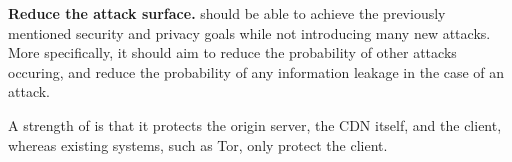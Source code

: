 {\bf Reduce the attack surface.} \system{} should be able to achieve the previously mentioned security 
and privacy goals while not introducing many new attacks.  More specifically, it should aim to reduce 
the probability of other attacks occuring, and reduce the probability of any information leakage in 
the case of an attack.




A strength of \system{} is that it protects the origin server, the CDN itself, and the client, whereas 
existing systems, such as Tor, only protect the client.

